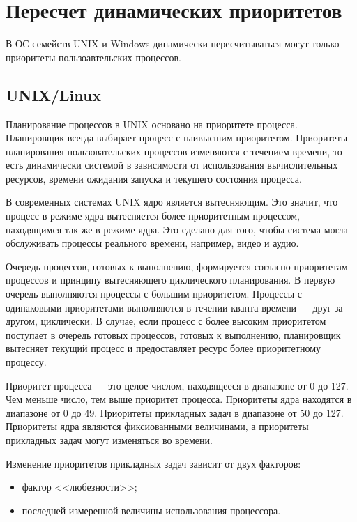 \chapter{Пересчет динамических приоритетов}

В ОС семейств UNIX и Windows динамически пересчитываться могут только приоритеты пользоавтельских процессов.

\section{UNIX/Linux}

Планирование процессов в UNIX основано на приоритете процесса.
Планировщик всегда выбирает процесс с наивысшим приоритетом.
Приоритеты планирования пользовательских процессов изменяются с течением времени, то есть динамически системой в зависимости от использования вычислительных ресурсов, времени ожидания запуска и текущего состояния процесса.

В современных системах UNIX ядро является вытесняющим.
Это значит, что процесс в режиме ядра вытесняется более приоритетным процессом, находящимся так же в режиме ядра.
Это сделано для того, чтобы система могла обслуживать процессы реального времени, например, видео и аудио.

Очередь процессов, готовых к выполнению, формируется согласно приоритетам процессов и принципу вытесняющего циклического планирования.
В первую очередь выполняются процессы с большим приоритетом.
Процессы с одинаковыми приоритетами выполняются в течении кванта времени --- друг за другом, циклически.
В случае, если процесс с более высоким приоритетом поступает в очередь готовых процессов, готовых к выполнению, планировщик вытесняет текущий процесс и предоставляет ресурс более приоритетному процессу.

Приоритет процесса --- это целое числом, находящееся в диапазоне от 0 до 127.
Чем меньше число, тем выше приоритет процесса.
Приоритеты ядра находятся в диапазоне от 0 до 49.
Приоритеты прикладных задач в диапазоне от 50 до 127.
Приоритеты ядра являются фиксиованными величинами, а приоритеты прикладных задач могут изменяться во времени.

Изменение приоритетов прикладных задач зависит от двух факторов: 
\begin{itemize}
	\item фактор <<любезности>>;
	\item последней измеренной величины использования процессора.
\end{itemize}

